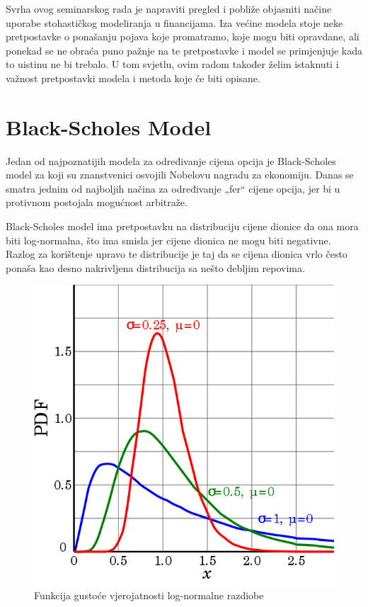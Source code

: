 \documentclass[times, utf8, seminar]{fer}
\begin{document}
Svrha ovog seminarskog rada je napraviti pregled i pobliže objasniti načine uporabe stohastičkog modeliranja u financijama. Iza većine modela stoje neke pretpostavke o ponašanju pojava koje promatramo, koje mogu biti opravdane, ali ponekad se ne obraća puno pažnje na te pretpostavke i model se primjenjuje kada to uistinu ne bi trebalo. U tom svjetlu, ovim radom također želim istaknuti i važnost pretpostavki modela i metoda koje će biti opisane.

\chapter{Black-Scholes Model}

Jedan od najpoznatijih modela za određivanje cijena opcija je Black-Scholes model za koji su znanstvenici osvojili Nobelovu nagradu za ekonomiju. Danas se smatra jednim od najboljih načina za određivanje „fer“ cijene opcija, jer bi u protivnom postojala mogućnost arbitraže.

Black-Scholes model ima pretpostavku na distribuciju cijene dionice da ona mora biti log-normalna, što ima smisla jer cijene dionica ne mogu biti negativne. Razlog za korištenje upravo te distribucije je taj da se cijena dionica vrlo često ponaša kao desno nakrivljena distribucija sa nešto debljim repovima.

\begin{figure}[h!]
\centering
\includegraphics[scale=0.4]{img/log_normal_pdf.png}
\caption{Funkcija gustoće vjerojatnosti log-normalne razdiobe}
\label{fig:log_normal_pdf}
\end{figure}
\end{document}
